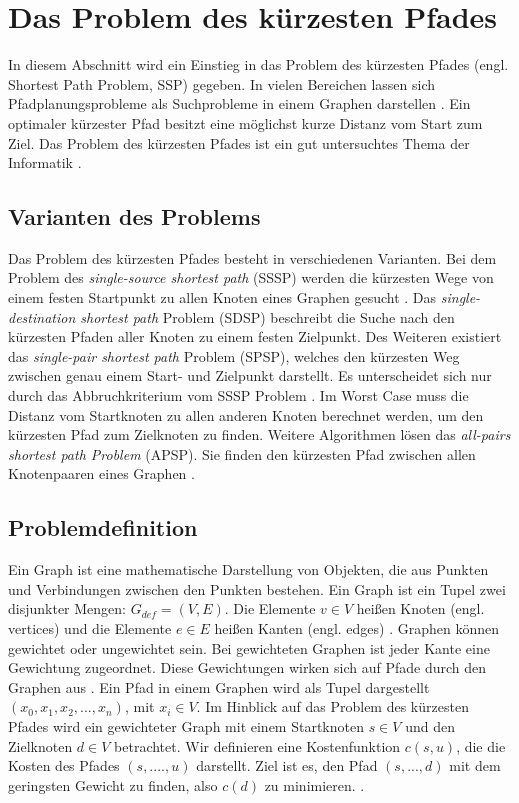 \chapter{Das Problem des kürzesten Pfades}

In diesem Abschnitt wird ein Einstieg in das Problem des kürzesten Pfades (engl. Shortest Path Problem, SSP) gegeben. In vielen Bereichen lassen sich Pfadplanungsprobleme als Suchprobleme in einem Graphen darstellen \cite{HartNilssonandRaphael.1968}. Ein optimaler kürzester Pfad besitzt eine möglichst kurze Distanz vom Start zum Ziel. Das Problem des kürzesten Pfades ist ein gut untersuchtes Thema der Informatik \cite[S.1]{Madkour.2017}.


\section{Varianten des Problems}

Das Problem des kürzesten Pfades besteht in verschiedenen Varianten. Bei dem Problem des \textit{single-source shortest path} (SSSP) werden die kürzesten Wege von einem festen Startpunkt zu allen Knoten eines Graphen gesucht \cite[S.644]{Cormen.2009}. Das \textit{single-destination shortest path} Problem (SDSP)  beschreibt die Suche nach den kürzesten Pfaden aller Knoten zu einem festen Zielpunkt. Des Weiteren existiert das \textit{single-pair shortest path} Problem (SPSP), welches den kürzesten Weg zwischen genau einem Start- und Zielpunkt darstellt. Es unterscheidet sich nur durch das Abbruchkriterium vom SSSP Problem \cite{Ottmann.2017}. Im Worst Case muss die Distanz vom Startknoten zu allen anderen Knoten berechnet werden, um den kürzesten Pfad zum Zielknoten zu finden. Weitere Algorithmen lösen das \textit{all-pairs shortest path Problem} (APSP). Sie finden den kürzesten Pfad zwischen allen Knotenpaaren eines Graphen \cite[S.644]{Cormen.2009}.


\section{Problemdefinition}
\label{Kostenfunktion}
Ein Graph ist eine mathematische Darstellung von Objekten, die aus Punkten und Verbindungen zwischen den Punkten bestehen. 
Ein Graph ist ein Tupel zwei disjunkter Mengen: $G_{def}= (V,E)$. Die Elemente $v \in V$ heißen Knoten (engl. vertices) und die Elemente $e \in E$ heißen Kanten (engl. edges) \cite[S.15]{Gross.2004}. 
Graphen können gewichtet oder ungewichtet sein. Bei gewichteten Graphen ist jeder Kante eine Gewichtung zugeordnet. 
Diese Gewichtungen wirken sich auf Pfade durch den Graphen aus \cite[S.18]{Gross.2004}. 
Ein Pfad in einem Graphen wird als Tupel dargestellt $\left ( x_{0}, x_{1}, x_{2}, ..., x_{n} \right )$, mit $x_{i} \in V$. 
Im Hinblick auf das Problem des kürzesten Pfades wird ein gewichteter Graph mit einem Startknoten $s \in V$ und den Zielknoten $d \in V$ betrachtet. Wir definieren eine Kostenfunktion $c(s,u)$, die die Kosten des Pfades $ (s, ...., u)$ darstellt. Ziel ist es, den Pfad  $\left ( s, ..., d \right )$ mit dem geringsten Gewicht zu finden, also $c(d)$ zu minimieren. \cite[S.4]{Madkour.2017}.


